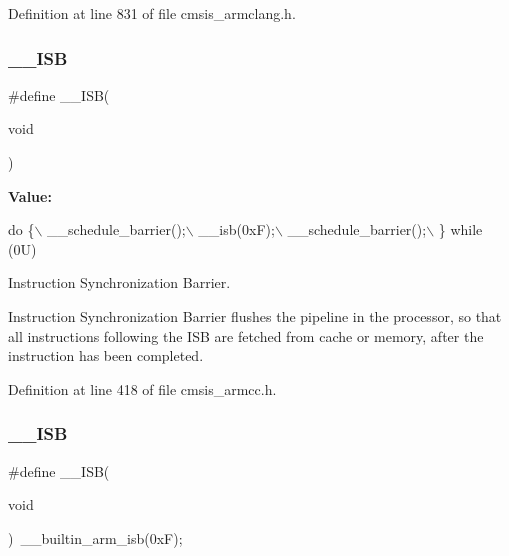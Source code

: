 Definition at line 831 of file cmsis\+\_\+armclang.\+h.

\mbox{\label{group___c_m_s_i_s___core___instruction_interface_gaad233022e850a009fc6f7602be1182f6}} 
\subsubsection{\texorpdfstring{\+\_\+\+\_\+\+I\+SB}{\_\_ISB}\hspace{0.1cm}{\footnotesize\ttfamily [1/2]}}
{\footnotesize\ttfamily \#define \+\_\+\+\_\+\+I\+SB(\begin{DoxyParamCaption}\item[{}]{void }\end{DoxyParamCaption})}

{\bfseries Value\+:}
\begin{DoxyCode}
\textcolor{keywordflow}{do} \{\(\backslash\)
                   \_\_schedule\_barrier();\(\backslash\)
                   \_\_isb(0xF);\(\backslash\)
                   \_\_schedule\_barrier();\(\backslash\)
                \} \textcolor{keywordflow}{while} (0U)
\end{DoxyCode}


Instruction Synchronization Barrier. 

Instruction Synchronization Barrier flushes the pipeline in the processor, so that all instructions following the I\+SB are fetched from cache or memory, after the instruction has been completed. 

Definition at line 418 of file cmsis\+\_\+armcc.\+h.

\mbox{\label{group___c_m_s_i_s___core___instruction_interface_gaad233022e850a009fc6f7602be1182f6}} 
\subsubsection{\texorpdfstring{\+\_\+\+\_\+\+I\+SB}{\_\_ISB}\hspace{0.1cm}{\footnotesize\ttfamily [2/2]}}
{\footnotesize\ttfamily \#define \+\_\+\+\_\+\+I\+SB(\begin{DoxyParamCaption}\item[{}]{void }\end{DoxyParamCaption})~\+\_\+\+\_\+builtin\+\_\+arm\+\_\+isb(0x\+F);}



